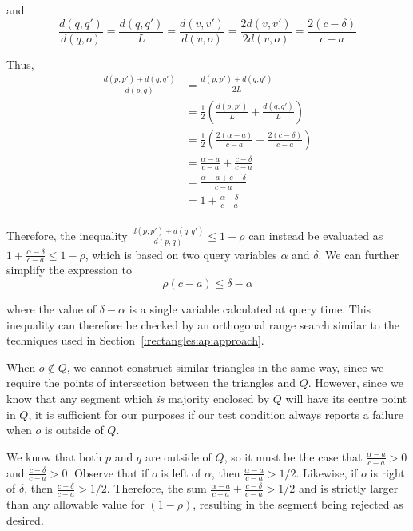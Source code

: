 \noindent and 
\[ 
\frac{d(q, q')}{d(q, o)} = \frac{d(q, q')}{L} = \frac{d(v, v')}{d(v, o)} = \frac{2 d(v, v')}{2 d(v, o)} = \frac{2(c - \delta)}{c - a}
\]

\noindent Thus,
\[
\begin{split} 
\frac{d(p, p') + d(q, q')}{d(p, q)}
%
&= \frac{d(p, p') + d(q, q')}{2L} \\
%
&= \frac{1}{2} \left ( \frac{d(p, p')}{L} + \frac{d(q, q')}{L} \right ) \\
%
&= \frac{1}{2} \left ( \frac{2(\alpha - a)}{c - a} + \frac{2(c - \delta)}{c - a} \right ) \\
%
&= \frac{\alpha - a}{c - a} + \frac{c - \delta}{c - a} \\
%
&= \frac{\alpha - a + c - \delta}{c - a} \\
%
&= 1 + \frac{\alpha - \delta}{c - a} \\
%
\end{split}
\]

Therefore, the inequality $\frac{d(p, p') + d(q, q')}{d(p, q)} \leq 1 - \rho$ can instead be evaluated as $1 + \frac{\alpha - \delta}{c - a} \leq 1 - \rho$, which is based on two query variables $\alpha$ and $\delta$.  We can further simplify the expression to
\[ 
\rho(c - a) \leq \delta - \alpha
\]

\noindent where the value of $\delta - \alpha$ is a single variable calculated at query time.  This inequality can therefore be checked by an orthogonal range search similar to the techniques used in Section~\ref{:rectangles:ap:approach}.

When $o \not \in Q$, we cannot construct similar triangles in the same way, since we require the points of intersection between the triangles and $Q$.  However, since we know that any segment which \emph{is} majority enclosed by $Q$ will have its centre point in $Q$, it is sufficient for our purposes if our test condition always reports a failure when $o$ is outside of $Q$.

We know that both $p$ and $q$ are outside of $Q$, so it must be the case that $\frac{\alpha - a}{c - a} > 0$ and $\frac{c - \delta}{c - a} > 0$. Observe that if $o$ is left of $\alpha$, then $\frac{\alpha - a}{c - a} > 1/2$. Likewise, if $o$ is right of $\delta$, then $\frac{c - \delta}{c - a} > 1/2$. Therefore, the sum $\frac{\alpha - a}{c - a} + \frac{c - \delta}{c - a} > 1/2$ and is strictly larger than any allowable value for $(1 - \rho)$, resulting in the segment being rejected as desired.


